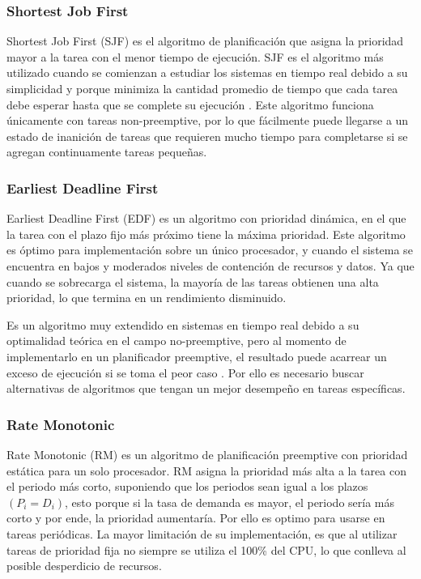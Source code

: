     \subsubsection{Shortest Job First}
    Shortest Job First (SJF) es el algoritmo de planificación que asigna la prioridad mayor a la tarea con el menor tiempo de ejecución. SJF es el algoritmo más utilizado cuando se comienzan a estudiar los sistemas en tiempo real debido a su simplicidad y porque minimiza la cantidad promedio de tiempo que cada tarea debe esperar hasta que se complete su ejecución \cite{Tanenbaum}. Este algoritmo funciona únicamente con tareas non-preemptive, por lo que fácilmente puede llegarse a un estado de inanición de tareas que requieren mucho tiempo para completarse si se agregan continuamente tareas pequeñas.
    
    \subsubsection{Earliest Deadline First} 
    Earliest Deadline First (EDF) es un algoritmo con prioridad dinámica, en el que la tarea con el plazo fijo más próximo tiene la máxima prioridad. Este algoritmo es óptimo para implementación sobre un único procesador, y cuando el sistema se encuentra en bajos y moderados niveles de contención de recursos y datos\cite{Liu}. Ya que cuando se sobrecarga el sistema, la mayoría de las tareas obtienen una alta prioridad, lo que termina en un rendimiento disminuido.
    
     \vspace{0.3cm}
     
    Es un algoritmo muy extendido en sistemas en tiempo real debido a su optimalidad teórica en el campo no-preemptive, pero al momento de implementarlo en un planificador preemptive, el resultado puede acarrear un exceso de ejecución si se toma el peor caso \cite{EmbSysDes}. Por ello es necesario buscar alternativas de algoritmos que tengan un mejor desempeño en tareas específicas.
    
     \subsubsection{Rate Monotonic}
    Rate Monotonic (RM) es un algoritmo de planificación preemptive con prioridad estática para un solo procesador\cite{Liu}. RM asigna la prioridad más alta a la tarea con el periodo más corto, suponiendo que los periodos sean igual a los plazos \( (P_{i} = D_{i}) \), esto porque si la tasa de demanda es mayor, el periodo sería más corto y por ende, la prioridad aumentaría. Por ello es optimo para usarse en tareas periódicas. La mayor limitación de su implementación, es que al utilizar tareas de prioridad fija no siempre se utiliza el 100\%  del CPU, lo que conlleva al posible desperdicio de recursos\cite{RM}.

